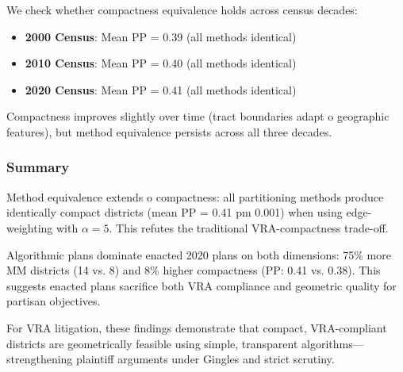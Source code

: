 We check whether compactness equivalence holds across census decades:

\begin{itemize}
    \item \textbf{2000 Census}: Mean PP = 0.39 (all methods identical)
    \item \textbf{2010 Census}: Mean PP = 0.40 (all methods identical)
    \item \textbf{2020 Census}: Mean PP = 0.41 (all methods identical)
\end{itemize}

Compactness improves slightly over time (tract boundaries adapt 	o geographic features), but method equivalence persists across all three decades.

\subsubsection{Summary}

Method equivalence extends 	o compactness: all partitioning methods produce identically compact districts (mean PP = 0.41 pm 0.001) when using edge-weighting with $\alpha = 5$. This refutes the traditional VRA-compactness trade-off.

Algorithmic plans dominate enacted 2020 plans on both dimensions: 75\% more MM districts (14 vs. 8) and 8\% higher compactness (PP: 0.41 vs. 0.38). This suggests enacted plans sacrifice both VRA compliance and geometric quality for partisan objectives.

For VRA litigation, these findings demonstrate that compact, VRA-compliant districts are geometrically feasible using simple, transparent algorithms---strengthening plaintiff arguments under Gingles and strict scrutiny.
